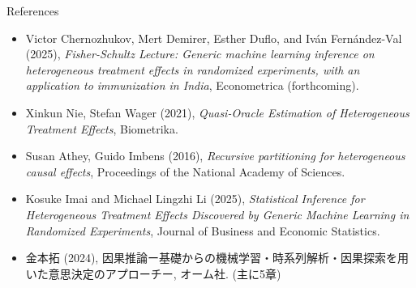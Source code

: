 \documentclass[xcolor=svgnames,aspectratio=169]{beamer}
\begin{document}
\begin{frame}{References}
    \begin{itemize}
        \item Victor Chernozhukov, Mert Demirer, Esther Duflo, and Iván Fernández-Val (2025), \textit{Fisher-Schultz Lecture: Generic machine learning inference on heterogeneous treatment effects in randomized experiments, with an application to immunization in India}, Econometrica (forthcoming).
        \item Xinkun Nie, Stefan Wager (2021), \textit{Quasi-Oracle Estimation of Heterogeneous Treatment Effects}, Biometrika.
        \item Susan Athey, Guido Imbens (2016), \textit{Recursive partitioning for heterogeneous causal effects}, Proceedings of the National Academy of Sciences. 
        \item Kosuke Imai and Michael Lingzhi Li (2025), \textit{Statistical Inference for Heterogeneous Treatment Effects Discovered by Generic Machine Learning in Randomized Experiments}, Journal of Business and Economic Statistics. 
        \item 金本拓 (2024), 因果推論ー基礎からの機械学習・時系列解析・因果探索を用いた意思決定のアプローチー, オーム社. (主に5章)
    \end{itemize}
\end{frame}
\end{document}
